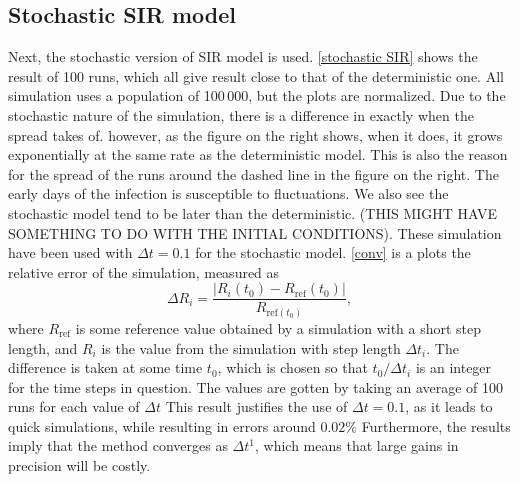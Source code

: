 \documentclass{article}
\begin{document}
    \subsection*{Stochastic SIR model}
    Next, the stochastic version of SIR model is used. \autoref{stochastic SIR} shows the result of 100 runs, which all give result close to that of the deterministic one. 
    All simulation uses a population of 100\,000, but the plots are normalized. 
    Due to the stochastic nature of the simulation, there is a difference in exactly when the spread takes of. 
    however, as the figure on the right shows, when it does, it grows exponentially at the same rate as the deterministic model. 
    This is also the reason for the spread of the runs around the dashed line in the figure on the right.
    The early days of the infection is susceptible to fluctuations.
    We also see the stochastic model tend to be later than the deterministic.
    (THIS MIGHT HAVE SOMETHING TO DO WITH THE INITIAL CONDITIONS).
    These simulation have been used with $\Delta t = 0.1$ for the stochastic model. 
    \autoref{conv} is a plots the relative error of the simulation, measured as 
    \begin{equation*}
        \Delta R_i = \frac{|R_i(t_0) - R_{\mathrm{ref}}(t_0)|}{R_{\mathrm{ref}(t_0)}},
    \end{equation*}
    where $R_{\mathrm{ref}}$ is some reference value obtained by a simulation with a short step length, and $R_i$ is the value from the simulation with step length $\Delta t_i$.
    The difference is taken at some time $t_0$, which is chosen so that $t_0/\Delta t_i$ is an integer for the time steps in question.
    The values are gotten by taking an average of 100 runs for each value of $\Delta t$
    This result justifies the use of $\Delta t = 0.1$, as it leads to quick simulations, while resulting in errors around $0.02\%$
    Furthermore, the results imply that the method converges as $\Delta t^1$, which means that large gains in precision will be costly.
    
\end{document}
